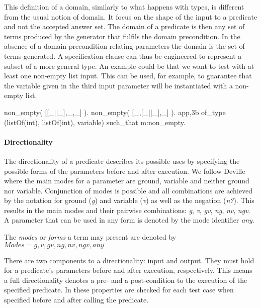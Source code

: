 This definition of a domain, similarly to what happens with types, is
different from the usual notion of domain.
%
It focus on the shape of the input to a predicate and not the accepted
answer set.
%
The \plqc{} domain of a predicate is then any set of terms produced by
the generator that fulfils the domain precondition.
%
In the absence of a domain precondition relating parameters the domain
is the set of terms generated.
%
A specification clause can thus be engineered to represent a subset of
a more general type.
%
An example could be that we want to test  with at least one
non-empty list input.
%
This can be used, for example, to guarantee that the variable given in
the third input parameter will be instantiated with a non-empty list.
\begin{yapcode}
 non_empty( [[_||_],_,_] ).
 non_empty( [_,[_||_],_] ).
 {app,3b} of_type (listOf(int), listOf(int), variable)
    such_that m:non_empty.
\end{yapcode}



\paragraph{\bf Directionality}

The directionality of a predicate describes its possible uses by
specifying the possible forms of the parameters before and after
execution.
%
We follow Deville~\cite{Deville1990logprog} where the main modes for a
parameter are ground, variable and neither ground
nor variable.
%
Conjunction of modes is possible and all combinations are achieved
by the notation for ground (\emph{g}) and variable (\emph{v}) as well as
the negation (\emph{n?}).
%
This results in the main modes and their pairwise combinations: \emph{g},
\emph{v}, \emph{gv},  \emph{ng}, \emph{nv}, \emph{ngv}.
%
A parameter that can be used in any form is denoted by the mode
identifier \emph{any}.


\begin{definition}
\label{def:modes}
The \emph{modes} or \emph{forms} a term may present are denoted by\\
 $Modes = {g, v, gv, ng, nv, ngv, any}$
\end{definition}


There are two components to a directionality: input and output.
%
They must hold for a predicate's parameters before and after execution,
respectively.
%
This means a full directionality denotes a pre- and a post-condition to
the execution of the specified predicate.
%
In \plqc{} these properties are checked for each test case when
specified before and after calling the predicate.


